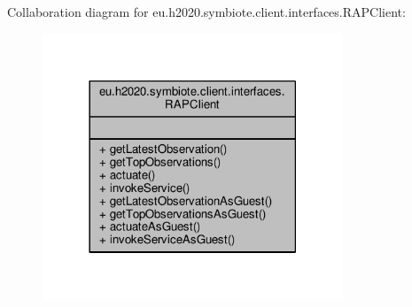 Collaboration diagram for eu.\+h2020.\+symbiote.\+client.\+interfaces.\+R\+A\+P\+Client\+:
\nopagebreak
\begin{figure}[H]
\begin{center}
\leavevmode
\includegraphics[width=254pt]{interfaceeu_1_1h2020_1_1symbiote_1_1client_1_1interfaces_1_1RAPClient__coll__graph}
\end{center}
\end{figure}
